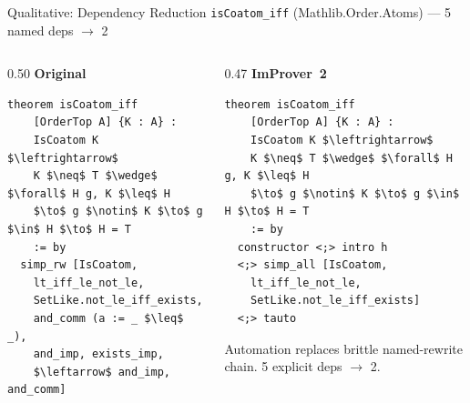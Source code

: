 \begin{frame}[fragile]{Qualitative: Dependency Reduction}
\vspace{0.2em}
{\small \texttt{isCoatom\_iff} (Mathlib.Order.Atoms) --- 5 named deps $\to$ 2}
\begin{columns}[T]
\begin{column}{0.50\textwidth}
\textbf{Original}
\begin{lstlisting}[basicstyle=\scriptsize\ttfamily]
theorem isCoatom_iff
    [OrderTop A] {K : A} :
    IsCoatom K $\leftrightarrow$
    K $\neq$ T $\wedge$ $\forall$ H g, K $\leq$ H
    $\to$ g $\notin$ K $\to$ g $\in$ H $\to$ H = T
    := by
  simp_rw [IsCoatom,
    lt_iff_le_not_le,
    SetLike.not_le_iff_exists,
    and_comm (a := _ $\leq$ _),
    and_imp, exists_imp,
    $\leftarrow$ and_imp, and_comm]
\end{lstlisting}
\end{column}
\begin{column}{0.47\textwidth}
\textbf{ImProver~2}
\begin{lstlisting}[basicstyle=\scriptsize\ttfamily]
theorem isCoatom_iff
    [OrderTop A] {K : A} :
    IsCoatom K $\leftrightarrow$
    K $\neq$ T $\wedge$ $\forall$ H g, K $\leq$ H
    $\to$ g $\notin$ K $\to$ g $\in$ H $\to$ H = T
    := by
  constructor <;> intro h
  <;> simp_all [IsCoatom,
    lt_iff_le_not_le,
    SetLike.not_le_iff_exists]
  <;> tauto
\end{lstlisting}
\vspace{0.3em}
\small Automation replaces brittle named-rewrite chain. 5 explicit deps $\to$ 2.
\end{column}
\end{columns}
\end{frame}

